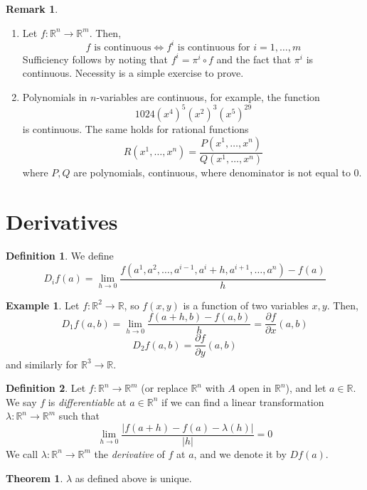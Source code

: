 \documentclass[a4paper,14pt]{extarticle}
\theoremstyle{definition}
\newtheorem*{theorem}{Theorem}
\newtheorem*{definition}{Definition}
\newtheorem*{eg}{Example}
\newtheorem*{remark}{Remark}
\begin{document}
\begin{remark} \hfill
	\begin{enumerate}
		\item Let $f:\mathbb{R}^n\rightarrow\mathbb{R}^m$. Then, \[f\text{ is continuous}\iff f^i\text{ is continuous for }i=1,\ldots,m\]
			Sufficiency follows by noting that $f^i=\pi^i\circ f$ and the fact that $\pi^i$ is continuous. Necessity is a simple exercise to prove.
		\item Polynomials in $n$-variables are continuous, for example, the function \[1024(x^4)^5(x^2)^3(x^5)^{29}\] is continuous. The same holds for rational functions
			\[R(x^1,\ldots,x^n)=\frac{P(x^1,\ldots,x^n)}{Q(x^1,\ldots,x^n)}\] where $P,Q$ are polynomials, continuous, where denominator is not equal to 0.
	\end{enumerate}
\end{remark}

\section{Derivatives}
\begin{definition}
	We define \[D_if(a)=\lim\limits_{h\to0}\frac{f(a^1,a^2,\ldots,a^{i-1},a^i+h,a^{i+1},\ldots,a^n)-f(a)}{h}\]
\end{definition}

\begin{eg}
	Let $f:\mathbb{R}^2\rightarrow\mathbb{R}$, so $f(x,y)$ is a function of two variables $x,y$. Then, 
	\[D_1f(a,b)=\lim\limits_{h\to0}\frac{f(a+h,b)-f(a,b)}{h}=\frac{\partial f}{\partial x}(a,b)\]
	\[D_2f(a,b)=\frac{\partial f}{\partial y}(a,b)\]
	and similarly for $\mathbb{R}^3\rightarrow\mathbb{R}$.
\end{eg}

\begin{definition}
	Let $f:\mathbb{R}^n\rightarrow\mathbb{R}^m$ (or replace $\mathbb{R}^n$ with $A$ open in $\mathbb{R}^n$), and let $a\in\mathbb{R}$. We say $f$ is \emph{differentiable}
	at $a\in\mathbb{R}^n$ if we can find a linear transformation $\lambda:\mathbb{R}^n\rightarrow\mathbb{R}^m$ such that 
	\begin{equation}
	\lim\limits_{h\to0}\frac{|f(a+h)-f(a)-\lambda(h)|}{|h|}=0
	\end{equation} We call $\lambda:\mathbb{R}^n\rightarrow\mathbb{R}^m$ the \emph{derivative} of $f$ at $a$, and we denote
	it by $Df(a)$.
\end{definition}

\begin{theorem}
	$\lambda$ as defined above is unique.
\end{theorem}
\end{document}
